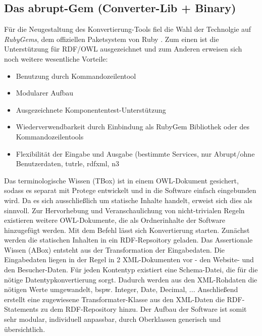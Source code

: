 \documentclass[runningheads,a4paper]{llncs}
\begin{document}
\subsection{Das abrupt-Gem (Converter-Lib + Binary)}
Für die Neugestaltung des Konvertierung-Tools fiel die Wahl der Technolgie auf \textit{RubyGems}, dem offiziellen Paketsystem von Ruby . 
Zum einen ist die Unterstützung \cite{ruby-rdf} für RDF/OWL ausgezeichnet und zum Anderen erweisen sich noch weitere wesentliche Vorteile:
\begin{itemize}
\item{Benutzung durch Kommandozeilentool}
\item{Modularer Aufbau}
\item{Ausgezeichnete Komponententest-Unterstützung}
\item{Wiederverwendbarkeit durch Einbindung als RubyGem Bibliothek oder des Kommandozeilentools}
\item{Flexibilität der Eingabe und Ausgabe (bestimmte Services, nur Abrupt/ohne Benutzerdaten, tutrle, rdfxml, n3}
\end{itemize}

Das terminologische Wissen (TBox) ist in einem OWL-Dokument gesichert, sodass es separat mit Protege entwickelt und in die Software einfach eingebunden wird. 
Da es sich ausschließlich um statische Inhalte handelt, erweist sich dies als sinnvoll. 
Zur Hervorhebung und Veranschaulichung von nicht-trivialen Regeln existieren weitere OWL-Dokumente, die als Ordnerinhalte der Software hinzugefügt werden. 
Mit dem Befehl \cite{ruby-rdf} lässt sich Konvertierung starten. 
Zunächst werden die statischen Inhalten in ein RDF-Repsoitory geladen. 
Das Assertionale Wissen (ABox) entsteht aus der Transformation der Eingabedaten. 
Die Eingabedaten liegen in der Regel in 2 XML-Dokumenten vor - den Website- und den Besucher-Daten.
Für jeden Kontentyp existiert eine Schema-Datei, die für die nötige Datentypkonvertierung sorgt. 
Dadurch werden aus den XML-Rohdaten die nötigen Werte umgewandelt, bspw. Integer, Date, Decimal, ...
Anschließend erstellt eine zugewiesene Transformater-Klasse aus den XML-Daten die RDF-Statements zu dem RDF-Repository hinzu. 
Der Aufbau der Software ist somit sehr modular, individuell anpassbar, durch Oberklassen generisch und übersichtlich.

\newpage
\end{document}
